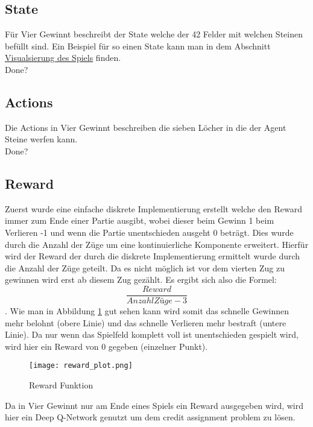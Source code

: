 \subsection{State}
 Für Vier Gewinnt beschreibt der State welche der 42 Felder mit welchen Steinen befüllt sind. Ein Beispiel für so einen State kann man in dem Abschnitt \hyperref[sec:visualisierung]{Visualsierung des Spiels} finden.\\
\colorbox{red!30}{Done?}

\subsection{Actions}
Die Actions in Vier Gewinnt beschreiben die sieben Löcher in die der Agent Steine werfen kann.\\
\colorbox{red!30}{Done?} 

\subsection{Reward}
 Zuerst wurde eine einfache diskrete Implementierung erstellt welche den Reward immer zum Ende einer Partie ausgibt, wobei dieser beim Gewinn 1 beim Verlieren -1 und wenn die Partie unentschieden ausgeht 0 beträgt.
Dies wurde durch die Anzahl der Züge um eine kontinuierliche Komponente erweitert. Hierfür wird der Reward der durch die diskrete Implementierung ermittelt wurde durch die Anzahl der Züge geteilt. Da es nicht möglich ist vor dem vierten Zug zu gewinnen wird erst ab diesem Zug gezählt. Es ergibt sich also die Formel: $$\frac{Reward}{Anzahl Züge-3}$$.
Wie man in Abbildung \ref{fig:reward_function} gut sehen kann wird somit das schnelle Gewinnen mehr belohnt (obere Linie) und das schnelle Verlieren mehr bestraft (untere Linie). Da nur wenn das Spielfeld komplett voll ist unentschieden gespielt wird, wird hier ein Reward von 0 gegeben (einzelner Punkt). \\

\begin{figure}[h!]
  \texttt{[image: reward\_plot.png]}
  \centering
  \caption{Reward Funktion}
  \label{fig:reward_function}
\end{figure}
Da in Vier Gewinnt nur am Ende eines Spiels ein Reward ausgegeben wird, wird hier ein Deep Q-Network genutzt um dem credit assignment problem zu lösen.

